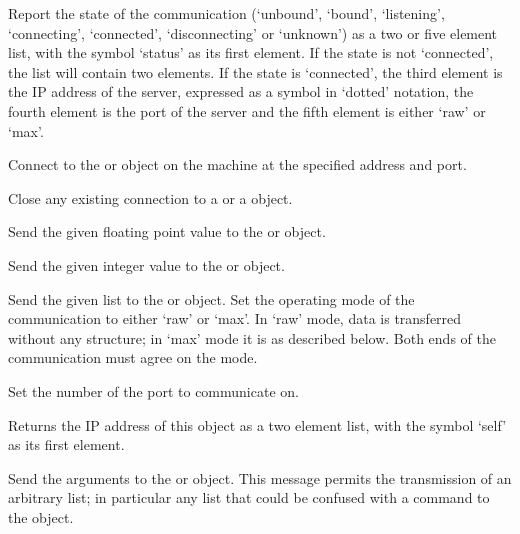


\objItemCommands[]

  \objListCmdBegin

  Report the state of the communication (`unbound', `bound', `listening', `connecting',
  `connected', `disconnecting' or `unknown') as a two or five element list, with the symbol
  `status' as its first element.
  If the state is not `connected', the list will contain two elements.
  If the state is `connected', the third element is the IP address of the server, expressed as a
  symbol in `dotted' notation, the fourth element is the port of the server and the fifth element is either
  `raw' or `max'.

  Connect to the  or  object on the machine at the
  specified address and port.

  Close any existing connection to a  or a  object.

  Send the given floating point value to the  or  object.

  Send the given integer value to the  or  object.

  Send the given list to the  or  object.
  Set the operating mode of the communication to either `raw' or `max'.
  In `raw' mode, data is transferred without any structure; in `max' mode it is as described below.
  Both ends of the communication must agree on the mode.
  
  Set the number of the port to communicate on.

  Returns the IP address of this object as a two element list, with the symbol `self' as its first
  element.
  
  Send the arguments to the  or  object.
  This message permits the transmission of an arbitrary list; in particular any list that could be
  confused with a command to the  object.

